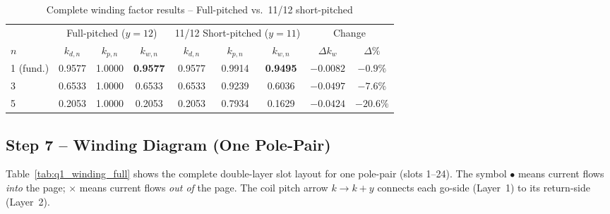 \documentclass[12pt,a4paper]{article}
\begin{document}
\begin{table}[H]
  \centering
  \caption{Complete winding factor results -- Full-pitched vs.\ 11/12 short-pitched}
  \label{tab:q1_kw}
  \begin{tabular}{lccc|ccc|cc}
    \toprule
    & \multicolumn{3}{c|}{Full-pitched ($y=12$)}
    & \multicolumn{3}{c|}{11/12 Short-pitched ($y=11$)}
    & \multicolumn{2}{c}{Change} \\
    \cmidrule(lr){2-4}\cmidrule(lr){5-7}\cmidrule(lr){8-9}
    $n$ & $k_{d,n}$ & $k_{p,n}$ & $k_{w,n}$
        & $k_{d,n}$ & $k_{p,n}$ & $k_{w,n}$
        & $\Delta k_{w}$ & $\Delta\%$ \\
    \midrule
    1 (fund.) & 0.9577 & 1.0000 & \textbf{0.9577}
              & 0.9577 & 0.9914 & \textbf{0.9495} & $-0.0082$ & $-0.9\%$ \\
    3         & 0.6533 & 1.0000 & 0.6533
              & 0.6533 & 0.9239 & 0.6036          & $-0.0497$ & $-7.6\%$ \\
    5         & 0.2053 & 1.0000 & 0.2053
              & 0.2053 & 0.7934 & 0.1629          & $-0.0424$ & $-20.6\%$ \\
    \bottomrule
  \end{tabular}
\end{table}

\subsection{Step 7 -- Winding Diagram (One Pole-Pair)}

Table~\ref{tab:q1_winding_full} shows the complete double-layer slot layout
for one pole-pair (slots 1--24).
The symbol $\bullet$ means current flows \emph{into} the page;
$\times$ means current flows \emph{out of} the page.
The coil pitch arrow $k \to k+y$ connects each go-side (Layer~1) to its
return-side (Layer~2).
\end{document}
